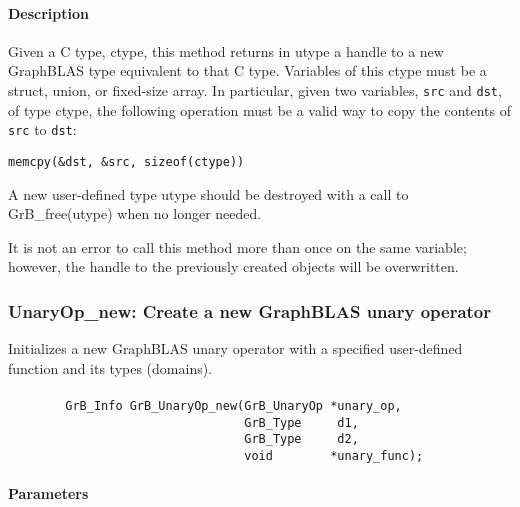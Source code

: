 \paragraph{Description}

Given a C type, {\sf ctype}, this method returns in {\sf utype} a handle to
a new GraphBLAS type equivalent to that C type.  Variables of this {\sf ctype} 
must be a struct, union, or fixed-size array. In particular, given two variables, 
{\tt src} and {\tt dst}, of type {\sf ctype}, the following operation must be a 
valid way to copy the contents of {\tt src} to {\tt dst}:

\begin{center}
{\tt memcpy(\&dst, \&src, sizeof({\sf ctype}))}
\end{center}

A new user-defined type {\sf utype} should be destroyed with a call to 
{\sf GrB\_free(utype)} when no longer needed.

It is not an error to call this method more than once on the same variable;  
however, the handle to the previously created objects will be overwritten. 

\subsubsection{{\sf UnaryOp\_new}: Create a new GraphBLAS unary operator}

Initializes a new GraphBLAS unary operator with a specified user-defined 
function and its types (domains).

\paragraph{\syntax}

\begin{verbatim}
        GrB_Info GrB_UnaryOp_new(GrB_UnaryOp *unary_op,
                                 GrB_Type     d1,
                                 GrB_Type     d2,
                                 void        *unary_func);
\end{verbatim}

\paragraph{Parameters}

